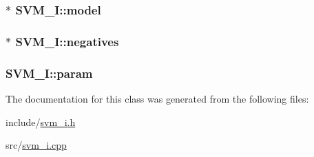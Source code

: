 \subsubsection[{model}]{$\ast$ S\+V\+M\+\_\+\+I\+::model}\hypertarget{classSVM__I_a7b7466c2246c73438ead77631278ff3a}{}\label{classSVM__I_a7b7466c2246c73438ead77631278ff3a}
\subsubsection[{negatives}]{$\ast$ S\+V\+M\+\_\+\+I\+::negatives}\hypertarget{classSVM__I_a8a56898f346ff15c5bb904ff6e001dad}{}\label{classSVM__I_a8a56898f346ff15c5bb904ff6e001dad}
\subsubsection[{param}]{ S\+V\+M\+\_\+\+I\+::param}\hypertarget{classSVM__I_afbec56807dada05e9e527587d25acfb6}{}\label{classSVM__I_afbec56807dada05e9e527587d25acfb6}


The documentation for this class was generated from the following files\+:\begin{DoxyCompactItemize}
\item 
include/\hyperlink{svm__i_8h}{svm\+\_\+i.\+h}\item 
src/\hyperlink{svm__i_8cpp}{svm\+\_\+i.\+cpp}\end{DoxyCompactItemize}
